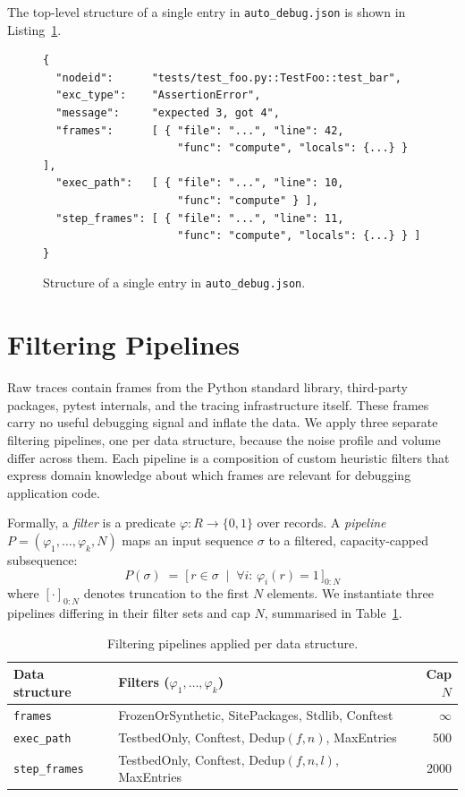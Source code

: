 The top-level structure of a single entry in \texttt{auto\_debug.json} is shown in Listing~\ref{lst:trace-entry}.

\begin{figure}[ht]
\begin{verbatim}
{
  "nodeid":      "tests/test_foo.py::TestFoo::test_bar",
  "exc_type":    "AssertionError",
  "message":     "expected 3, got 4",
  "frames":      [ { "file": "...", "line": 42,
                     "func": "compute", "locals": {...} } ],
  "exec_path":   [ { "file": "...", "line": 10,
                     "func": "compute" } ],
  "step_frames": [ { "file": "...", "line": 11,
                     "func": "compute", "locals": {...} } ]
}
\end{verbatim}
\caption{Structure of a single entry in \texttt{auto\_debug.json}.}
\label{lst:trace-entry}
\end{figure}


\section{Filtering Pipelines}
\label{sec:filtering}

Raw traces contain frames from the Python standard library, third-party packages, pytest internals, and the tracing infrastructure itself. These frames carry no useful debugging signal and inflate the data. We apply three separate filtering pipelines, one per data structure, because the noise profile and volume differ across them. Each pipeline is a composition of custom heuristic filters that express domain knowledge about which frames are relevant for debugging application code.

Formally, a \emph{filter} is a predicate $\varphi : R \to \{0, 1\}$ over records. A \emph{pipeline} $P = (\varphi_1, \dots, \varphi_k, N)$ maps an input sequence $\sigma$ to a filtered, capacity-capped subsequence:
\[
  P(\sigma) \;=\; \bigl[\, r \in \sigma \;\mid\; \forall i:\, \varphi_i(r) = 1 \,\bigr]_{0:N}
\]
where $[\cdot]_{0:N}$ denotes truncation to the first $N$ elements. We instantiate three pipelines differing in their filter sets and cap $N$, summarised in Table~\ref{tab:pipelines}.

\begin{table}[ht]
\centering
\caption{Filtering pipelines applied per data structure.}
\label{tab:pipelines}
\begin{tabular}{@{}llr@{}}
\toprule
\textbf{Data structure} & \textbf{Filters} ($\varphi_1, \dots, \varphi_k$) & \textbf{Cap $N$} \\
\midrule
\texttt{frames}      & FrozenOrSynthetic, SitePackages, Stdlib, Conftest   & $\infty$ \\
\texttt{exec\_path}  & TestbedOnly, Conftest, Dedup$(f, n)$, MaxEntries    & 500 \\
\texttt{step\_frames}& TestbedOnly, Conftest, Dedup$(f, n, l)$, MaxEntries & 2000 \\
\bottomrule
\end{tabular}
\end{table}


